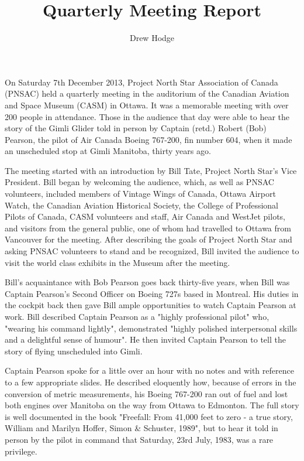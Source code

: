 




\title{Quarterly Meeting Report}
\author{Drew Hodge}

\maketitle

On Saturday 7th December 2013, Project North Star Association of
Canada (PNSAC) held a quarterly meeting in the auditorium of the
Canadian Aviation and Space Museum (CASM) in Ottawa. It was a
memorable meeting with over 200 people in attendance. Those in the
audience that day were able to hear the story of the Gimli Glider told
in person by Captain (retd.) Robert (Bob) Pearson, the pilot of Air
Canada Boeing 767-200, fin number 604, when it made an unscheduled
stop at Gimli Manitoba, thirty years ago.

The meeting started with an introduction by Bill Tate, Project North
Star's Vice President.  Bill began by welcoming the audience, which,
as well as PNSAC volunteers, included members of Vintage Wings of
Canada, Ottawa Airport Watch, the Canadian Aviation Historical
Society, the College of Professional Pilots of Canada, CASM volunteers
and staff, Air Canada and WestJet pilots, and visitors from the
general public, one of whom had travelled to Ottawa from Vancouver for
the meeting. After describing the goals of Project North Star and
asking PNSAC volunteers to stand and be recognized, Bill invited the
audience to visit the world class exhibits in the Museum after the
meeting.

Bill's acquaintance with Bob Pearson goes back thirty-five years, when
Bill was Captain Pearson's Second Officer on Boeing 727s based in
Montreal. His duties in the cockpit back then gave Bill ample
opportunities to watch Captain Pearson at work. Bill described Captain
Pearson as a "highly professional pilot" who, "wearing his command
lightly", demonstrated "highly polished interpersonal skills and a
delightful sense of humour".  He then invited Captain Pearson to tell
the story of flying unscheduled into Gimli.

Captain Pearson spoke for a little over an hour with no notes and with
reference to a few appropriate slides.  He described eloquently how,
because of errors in the conversion of metric measurements, his Boeing
767-200 ran out of fuel and lost both engines over Manitoba on the way
from Ottawa to Edmonton. The full story is well documented in the book
"Freefall: From 41,000 feet to zero - a true story, William and
Marilyn Hoffer, Simon \& Schuster, 1989", but to hear it told in
person by the pilot in command that Saturday, 23rd July, 1983, was a
rare privilege.

